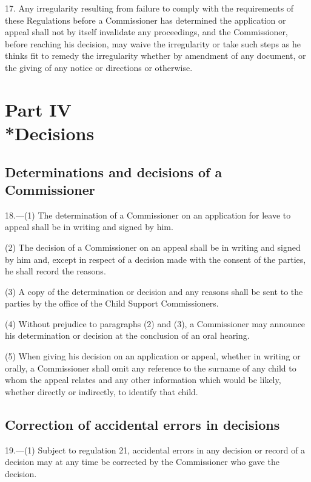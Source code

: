 \documentclass[a4paper]{article}
\newcommand{\parthead}{}
\begin{document}
17.  Any irregularity resulting from failure to comply with the requirements of these Regulations before a Commissioner has determined the application or appeal shall not by itself invalidate any proceedings, and the Commissioner, before reaching his decision, may waive the irregularity or take such steps as he thinks fit to remedy the irregularity whether by amendment of any document, or the giving of any notice or directions or otherwise.

\section[Part IV --- Decisions]{Part IV\\*Decisions}

\renewcommand\parthead{--- Part IV}

\subsection[18. Determinations and decisions of a Commissioner]{Determinations and decisions of a Commissioner}

18.—(1) The determination of a Commissioner on an application for leave to appeal shall be in writing and signed by him.

(2) The decision of a Commissioner on an appeal shall be in writing and signed by him and, except in respect of a decision made with the consent of the parties, he shall record the reasons.

(3) A copy of the determination or decision and any reasons shall be sent to the parties by the office of the Child Support Commissioners.

(4) Without prejudice to paragraphs (2) and (3), a Commissioner may announce his determination or decision at the conclusion of an oral hearing.

(5) When giving his decision on an application or appeal, whether in writing or orally, a Commissioner shall omit any reference to the surname of any child to whom the appeal relates and any other information which would be likely, whether directly or indirectly, to identify that child.

\subsection[19. Correction of accidental errors in decisions]{Correction of accidental errors in decisions}

19.—(1) Subject to regulation 21, accidental errors in any decision or record of a decision may at any time be corrected by the Commissioner who gave the decision.
\end{document}
